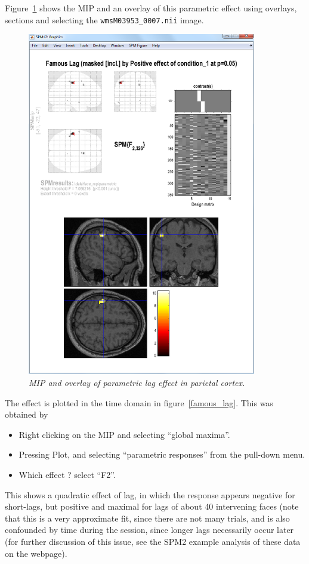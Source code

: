 Figure~\ref{famous_lag_mip} shows the MIP and an overlay of this parametric effect using overlays, sections and selecting the \texttt{wmsM03953\_0007.nii} image. 
\begin{figure}
\begin{center}
\includegraphics[width=100mm]{faces/famous_lag_mip}
\caption{\em MIP and overlay of parametric lag effect in parietal cortex. \label{famous_lag_mip} }
\end{center}
\end{figure}
The effect is plotted in the time domain in figure~\ref{famous_lag}. This was obtained by
\begin{itemize}
\item Right clicking on the MIP and selecting ``global maxima''.
\item Pressing Plot, and selecting ``parametric responses'' from the pull-down menu.
\item Which effect ? select ``F2''.
\end{itemize}

This shows a quadratic effect of lag, in which the response appears negative for short-lags, but positive and maximal for lags of about 40 intervening faces (note that this is a very approximate fit, since there are not many trials, and is also confounded by time during the session, since longer lags necessarily occur later (for further discussion of this issue, see the SPM2 example analysis of these data on the webpage).

